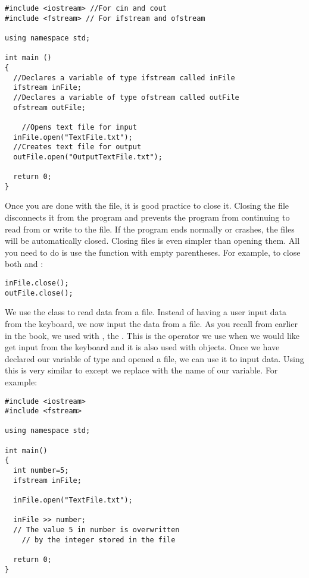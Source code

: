\noindent\begin{minipage}{\linewidth}\begin{lstlisting}
#include <iostream> //For cin and cout 
#include <fstream> // For ifstream and ofstream
		
using namespace std;
		
int main ()
{
  //Declares a variable of type ifstream called inFile
  ifstream inFile; 
  //Declares a variable of type ofstream called outFile
  ofstream outFile; 
	
	//Opens text file for input
  inFile.open("TextFile.txt"); 
  //Creates text file for output
  outFile.open("OutputTextFile.txt"); 
	
  return 0;
}
\end{lstlisting}\end{minipage}


Once you are done with the file, it is good practice to close it. 
Closing the file disconnects it from the program and prevents the program from continuing to read from or write to the file. 
If the program ends normally or crashes, the files will be automatically closed. 
Closing files is even simpler than opening them. 
All you need to do is use the  function with empty parentheses. 
For example, to close both  and :

\noindent\begin{minipage}{\linewidth}\begin{lstlisting}		
inFile.close();
outFile.close();
\end{lstlisting}\end{minipage}
	

We use the  class to read data from a file. 
Instead of having a user input data from the keyboard, we now input the data from a file. 
As you recall from earlier in the book, we used  with \Code{>>}, the . 
This is the operator we use when we would like get input from the keyboard and it is also used with  objects. 
Once we have declared our variable of type  and opened a file, we can use it to input data. 
Using this is very similar to  except we replace  with the name of our variable.
For example:

\noindent\begin{minipage}{\linewidth}\begin{lstlisting}		
#include <iostream> 
#include <fstream>
	
using namespace std;

int main()
{
  int number=5;
  ifstream inFile;

  inFile.open("TextFile.txt");

  inFile >> number; 
  // The value 5 in number is overwritten
	// by the integer stored in the file

  return 0;
}
\end{lstlisting}\end{minipage}		

